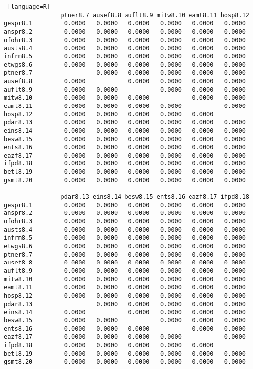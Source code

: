 \begin{lstlisting} [language=R]
                ptner8.7 ausef8.8 auflt8.9 mitw8.10 eamt8.11 hosp8.12
gespr8.1         0.0000   0.0000   0.0000   0.0000   0.0000   0.0000  
anspr8.2         0.0000   0.0000   0.0000   0.0000   0.0000   0.0000  
ofohr8.3         0.0000   0.0000   0.0000   0.0000   0.0000   0.0000  
austs8.4         0.0000   0.0000   0.0000   0.0000   0.0000   0.0000  
infrm8.5         0.0000   0.0000   0.0000   0.0000   0.0000   0.0000  
etwgs8.6         0.0000   0.0000   0.0000   0.0000   0.0000   0.0000  
ptner8.7                  0.0000   0.0000   0.0000   0.0000   0.0000  
ausef8.8         0.0000            0.0000   0.0000   0.0000   0.0000  
auflt8.9         0.0000   0.0000            0.0000   0.0000   0.0000  
mitw8.10         0.0000   0.0000   0.0000            0.0000   0.0000  
eamt8.11         0.0000   0.0000   0.0000   0.0000            0.0000  
hosp8.12         0.0000   0.0000   0.0000   0.0000   0.0000           
pdar8.13         0.0000   0.0000   0.0000   0.0000   0.0000   0.0000  
eins8.14         0.0000   0.0000   0.0000   0.0000   0.0000   0.0000  
besw8.15         0.0000   0.0000   0.0000   0.0000   0.0000   0.0000  
ents8.16         0.0000   0.0000   0.0000   0.0000   0.0000   0.0000  
eazf8.17         0.0000   0.0000   0.0000   0.0000   0.0000   0.0000  
ifpd8.18         0.0000   0.0000   0.0000   0.0000   0.0000   0.0000  
betl8.19         0.0000   0.0000   0.0000   0.0000   0.0000   0.0000  
gsmt8.20         0.0000   0.0000   0.0000   0.0000   0.0000   0.0000  
  
                pdar8.13 eins8.14 besw8.15 ents8.16 eazf8.17 ifpd8.18
gespr8.1         0.0000   0.0000   0.0000   0.0000   0.0000   0.0000  
anspr8.2         0.0000   0.0000   0.0000   0.0000   0.0000   0.0000  
ofohr8.3         0.0000   0.0000   0.0000   0.0000   0.0000   0.0000  
austs8.4         0.0000   0.0000   0.0000   0.0000   0.0000   0.0000  
infrm8.5         0.0000   0.0000   0.0000   0.0000   0.0000   0.0000  
etwgs8.6         0.0000   0.0000   0.0000   0.0000   0.0000   0.0000  
ptner8.7         0.0000   0.0000   0.0000   0.0000   0.0000   0.0000  
ausef8.8         0.0000   0.0000   0.0000   0.0000   0.0000   0.0000  
auflt8.9         0.0000   0.0000   0.0000   0.0000   0.0000   0.0000  
mitw8.10         0.0000   0.0000   0.0000   0.0000   0.0000   0.0000  
eamt8.11         0.0000   0.0000   0.0000   0.0000   0.0000   0.0000  
hosp8.12         0.0000   0.0000   0.0000   0.0000   0.0000   0.0000  
pdar8.13                  0.0000   0.0000   0.0000   0.0000   0.0000  
eins8.14         0.0000            0.0000   0.0000   0.0000   0.0000  
besw8.15         0.0000   0.0000            0.0000   0.0000   0.0000  
ents8.16         0.0000   0.0000   0.0000            0.0000   0.0000  
eazf8.17         0.0000   0.0000   0.0000   0.0000            0.0000  
ifpd8.18         0.0000   0.0000   0.0000   0.0000   0.0000           
betl8.19         0.0000   0.0000   0.0000   0.0000   0.0000   0.0000  
gsmt8.20         0.0000   0.0000   0.0000   0.0000   0.0000   0.0000  
 

\end{lstlisting}
